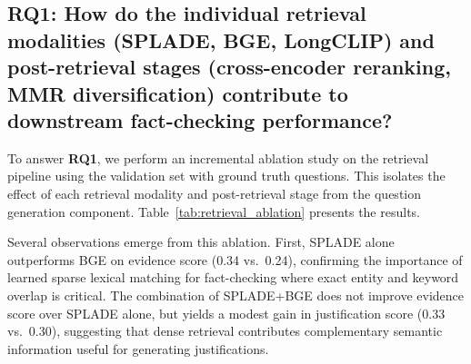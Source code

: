 \subsection{RQ1: How do the individual retrieval modalities (SPLADE, BGE, LongCLIP) and post-retrieval stages (cross-encoder reranking, MMR diversification) contribute to downstream fact-checking performance?}

To answer \textbf{RQ1}, we perform an incremental ablation study on the retrieval pipeline using the validation set with ground truth questions. This isolates the effect of each retrieval modality and post-retrieval stage from the question generation component. Table~\ref{tab:retrieval_ablation} presents the results.

\begin{table}[ht]
\centering
\caption{Retrieval ablation results on the validation set with ground truth questions.}
\label{tab:retrieval_ablation}
\end{table}

Several observations emerge from this ablation. First, SPLADE alone outperforms BGE on evidence score (0.34 vs.\ 0.24), confirming the importance of learned sparse lexical matching for fact-checking where exact entity and keyword overlap is critical. The combination of SPLADE+BGE does not improve evidence score over SPLADE alone, but yields a modest gain in justification score (0.33 vs.\ 0.30), suggesting that dense retrieval contributes complementary semantic information useful for generating justifications.

